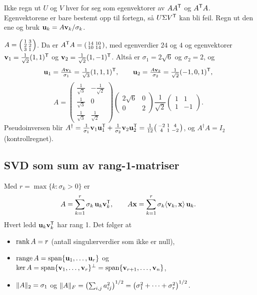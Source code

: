 \begin{fallgruve}
Ikke regn ut $U$ og $V$ hver for seg som egenvektorer av $AA^{\mathsf{T}}$ og $A^{\mathsf{T}} A$. Egenvektorene er bare bestemt opp til fortegn, så $U\Sigma V^{\mathsf{T}}$ kan bli feil. Regn ut den ene og bruk $\mathbf{u}_k=A\mathbf{v}_k/\sigma_k$.
\end{fallgruve}

\begin{eksempel}
$A=\begin{psmallmatrix}1&3\\2&2\\3&1\end{psmallmatrix}$. Da er $A^{\mathsf{T}} A=\begin{psmallmatrix}14&10\\10&14\end{psmallmatrix}$, med egenverdier $24$ og $4$ og egenvektorer $\mathbf{v}_1=\tfrac{1}{\sqrt2}(1,1)^{\mathsf{T}}$ og $\mathbf{v}_2=\tfrac1{\sqrt2}(1,-1)^{\mathsf{T}}$. Altså er $\sigma_1=2\sqrt6$ og $\sigma_2=2$, og
\[
\mathbf{u}_1=\tfrac{A\mathbf{v}_1}{\sigma_1}=\tfrac{1}{\sqrt3}(1,1,1)^{\mathsf{T}},\qquad \mathbf{u}_2=\tfrac{A\mathbf{v}_2}{\sigma_2}=\tfrac1{\sqrt2}(-1,0,1)^{\mathsf{T}},
\]
\[
A=\begin{pmatrix}\frac1{\sqrt3}&-\frac1{\sqrt2}\\[2pt] \frac1{\sqrt3}&0\\[2pt] \frac1{\sqrt3}&\frac1{\sqrt2}\end{pmatrix}
\begin{pmatrix}2\sqrt6&0\\0&2\end{pmatrix}\frac1{\sqrt2}\begin{pmatrix}1&1\\1&-1\end{pmatrix}.
\]
Pseudoinversen blir $A^\dagger=\frac1{\sigma_1}\mathbf{v}_1\mathbf{u}_1^{\mathsf{T}}+\frac1{\sigma_2}\mathbf{v}_2\mathbf{u}_2^{\mathsf{T}}=\frac1{12}\begin{psmallmatrix}-2&1&4\\4&1&-2\end{psmallmatrix}$, og $A^\dagger A=I_2$ (kontrollregnet).
\end{eksempel}

\subsection{SVD som sum av rang-1-matriser}
\begin{teorem}
Med $r=\max\{k:\sigma_k>0\}$ er
\[
A=\sum_{k=1}^{r}\sigma_k\,\mathbf{u}_k\mathbf{v}_k^{\mathsf{T}},\qquad A\mathbf{x}=\sum_{k=1}^{r}\sigma_k\langle \mathbf{v}_k,\mathbf{x}\rangle\,\mathbf{u}_k .
\]
Hvert ledd $\mathbf{u}_k\mathbf{v}_k^{\mathsf{T}}$ har rang 1. Det følger at
\begin{itemize}
  \item $\operatorname{rank} A=r$ (antall singulærverdier som ikke er null),
  \item $\operatorname{range} A=\operatorname{span}\{\mathbf{u}_1,\dots,\mathbf{u}_r\}$ og $\operatorname{ker} A=\operatorname{span}\{\mathbf{v}_1,\dots,\mathbf{v}_r\}^\perp=\operatorname{span}\{\mathbf{v}_{r+1},\dots,\mathbf{v}_n\}$,
  \item $\lVert A\rVert_2=\sigma_1$ og $\lVert A\rVert_F=\bigl(\sum_{i,j}a_{ij}^2\bigr)^{1/2}=\bigl(\sigma_1^2+\dots+\sigma_r^2\bigr)^{1/2}$.
\end{itemize}
\end{teorem}

